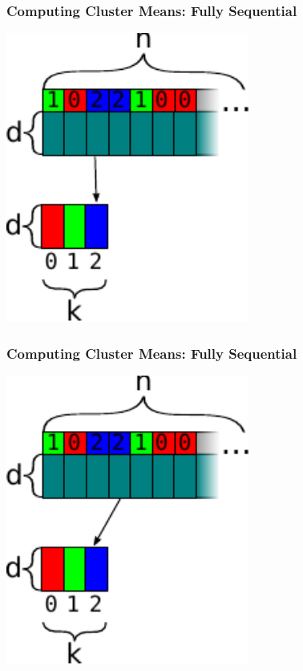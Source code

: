 \documentclass[rgb,dvipsnames]{beamer}
\begin{document}
\begin{frame}[fragile]
  \frametitle{Computing Cluster Means: Fully Sequential}

  \begin{center}
\includegraphics[width=0.6\textwidth]{img/cluster_means_seq_2.pdf}
\end{center}
\end{frame}

\begin{frame}[fragile]
  \frametitle{Computing Cluster Means: Fully Sequential}

  \begin{center}
\includegraphics[width=0.6\textwidth]{img/cluster_means_seq_3.pdf}
\end{center}

\end{frame}
\end{document}
